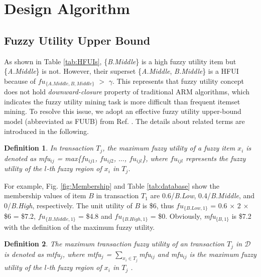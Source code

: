 \documentclass[journal]{IEEEtran}
\newtheorem{definition}{Definition}[section]
\begin{document}
\section{Design Algorithm}
\label{sec:algorithm}



\subsection{Fuzzy Utility Upper Bound}

As shown in Table \ref{tab:HFUIs}, \{\textit{B.Middle}\} is a high fuzzy utility item but \{\textit{A.Middle}\} is not. However, their superset \{\textit{A.Middle}, \textit{B.Middle}\} is a HFUI because of $fu_{\{A.Middle, B,Middle\}}$ $>$ $\gamma$. This represents that fuzzy utility concept does not hold \textit{downward-closure} property of traditional ARM algorithms, which indicates the fuzzy utility mining task is more difficult than frequent itemset mining. To resolve this issue, we adopt an effective fuzzy utility upper-bound model (abbreviated as FUUB) from Ref. \cite{lan2015fuzzy}. The details about related terms are introduced in the following.

\begin{definition}
	\rm  In transaction $T_j$, the maximum fuzzy utility of a fuzzy item $x_i$ is denoted as \textit{mfu}$_{ij}$ = \textit{max}\{$fu_{ij1}$, $fu_{ij2}$, $\ldots$, $fu_{ijl}$\}, where $fu_{ijl}$ represents the fuzzy utility of the $l$-th fuzzy region of $x_i$ in $T_j$.
\end{definition}

For example, Fig. \ref{fig:Membership} and Table \ref{tab:database} show the membership values of item $B$ in transaction $T_1$ are 0.6/\textit{B.Low}, 0.4/\textit{B.Middle}, and 0/\textit{B.High}, respectively. The unit utility of $B$ is \$6, thus $fu_{\{B.Low, 1\}}$ = 0.6 $\times$ 2 $\times$ \$6 = \$7.2, $fu_{\{B.Middle, 1\}}$ = \$4.8 and $fu_{\{B.High, 1\}}$ = \$0. Obviously, \textit{mfu}$_{\{B, 1\}}$ is \$7.2 with the definition of the maximum fuzzy utility.

\begin{definition}
	\rm The maximum transaction fuzzy utility of an transaction $T_j$ in $\mathcal{D}$ is denoted as \textit{mtfu}$_j$, where \textit{mtfu}$_j$ = $\sum_{x_i \in T_j}$\textit{mfu}$_{ij}$ and \textit{mfu}$_{ij}$ is the maximum fuzzy utility of the $l$-th fuzzy region of $x_i$ in $T_j$ \cite{lan2015fuzzy}.
\end{definition}
\end{document}
